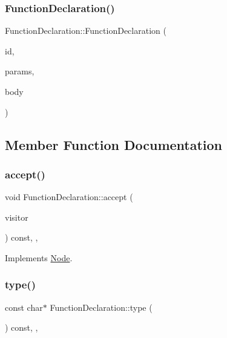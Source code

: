 \subsubsection{\texorpdfstring{Function\+Declaration()}{FunctionDeclaration()}}
{\footnotesize\ttfamily Function\+Declaration\+::\+Function\+Declaration (\begin{DoxyParamCaption}\item[{\hyperlink{struct_identifier}{Identifier} $\ast$}]{id,  }\item[{\hyperlink{struct_formal_parameter_list}{Formal\+Parameter\+List} $\ast$}]{params,  }\item[{\hyperlink{struct_function_body}{Function\+Body} $\ast$}]{body }\end{DoxyParamCaption})\hspace{0.3cm}{\ttfamily [inline]}}



\subsection{Member Function Documentation}
\mbox{\label{struct_function_declaration_ada618c9934e5706066e5521afeada149}} 
\subsubsection{\texorpdfstring{accept()}{accept()}}
{\footnotesize\ttfamily void Function\+Declaration\+::accept (\begin{DoxyParamCaption}\item[{\hyperlink{struct_visitor}{Visitor} \&}]{visitor }\end{DoxyParamCaption}) const\hspace{0.3cm}{\ttfamily [inline]}, {\ttfamily [override]}, {\ttfamily [virtual]}}



Implements \hyperlink{struct_node_a10bd7af968140bbf5fa461298a969c71}{Node}.

\mbox{\label{struct_function_declaration_aff2da7f2c794e8ce1c3c7c15e9f88eb7}} 
\subsubsection{\texorpdfstring{type()}{type()}}
{\footnotesize\ttfamily const char$\ast$ Function\+Declaration\+::type (\begin{DoxyParamCaption}{ }\end{DoxyParamCaption}) const\hspace{0.3cm}{\ttfamily [inline]}, {\ttfamily [override]}, {\ttfamily [virtual]}}



